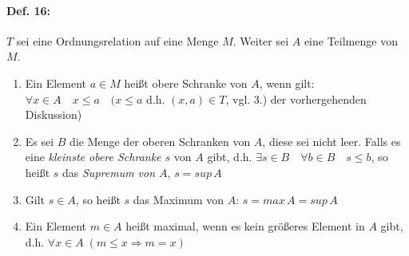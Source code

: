 \paragraph{Def. 16:} \parskp
$T$ sei eine Ordnungsrelation auf eine Menge $M$. Weiter sei $A$ eine Teilmenge von $M$.
\begin{enumerate} [label=\alph*)]
\item Ein Element $a \in M$ heißt obere Schranke von $A$, wenn gilt:\\
$\forall x \in A \quad x \leq a \quad (x \leq a$ d.h. $(x,a) \in T$, vgl. 3.) der vorhergehenden Diskussion)
\item Es sei $B$ die Menge der oberen Schranken von $A$, diese sei nicht leer. Falls es eine \emph{kleinste obere Schranke $s$} von $A$ gibt, d.h. $\exists s \in B \quad \forall b \in B \quad s \leq b$, so heißt $s$ das \emph{Supremum von $A$}, $\boxed{s = sup \, A}$
\item Gilt $s \in A$, so heißt $s$ das Maximum von $A$: $s = max \, A = sup \, A$
\item Ein Element $m \in A$ heißt maximal, wenn es kein größeres Element in $A$ gibt, d.h. $\forall x \in A \; (m \leq x \Rightarrow m=x)$
\end{enumerate}

